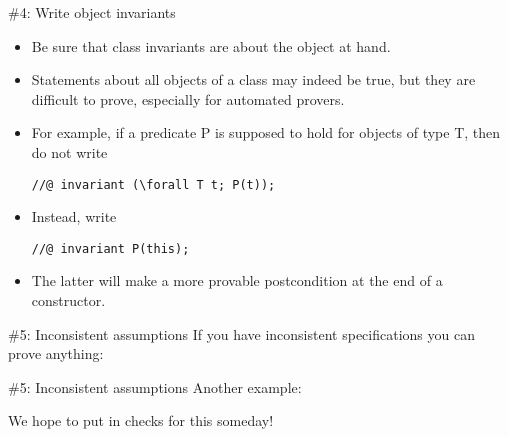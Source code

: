 \documentclass[
pdf,
nocolorBG,
slideColor,
cok,
]{prosper}
\newcommand{\verbatimcode}[1]{
\begin{figure*}
\tiny

\end{figure*}
}
\begin{document}
%%%%%%%%%%%%%%%%%%%%%%%%%%%%%%%%%%%%%%%%%%%%%%%%%%%%%%%%%%%%%%%%%%%%%%%%%%%%%

\begin{slide}{\#4: Write object invariants}
\vspace*{-6ex}
\begin{itemize}
\item Be sure that class invariants are about the object at hand.  
\item Statements about all objects of
a class may indeed be true, but they are difficult to prove, especially for automated provers.

\item For example, if a predicate P is supposed to hold for objects of type T, then do {\red not} write
\begin{verbatim}
//@ invariant (\forall T t; P(t));
\end{verbatim}

\item Instead, write
\begin{verbatim}
//@ invariant P(this);
\end{verbatim}

\item The latter will make a more provable postcondition at the end of a constructor.
\end{itemize}

\end{slide}


\begin{slide}{\#5: Inconsistent assumptions}
\vspace*{-3ex}
If you have inconsistent specifications you can prove anything:

\verbatimcode{examples/Inconsistent.java}
\end{slide}

\begin{slide}{\#5: Inconsistent assumptions}
\vspace*{-3ex}
Another example:

\verbatimcode{examples/Inconsistent2.java}

We hope to put in checks for this someday!

\end{slide}




\end{document}
